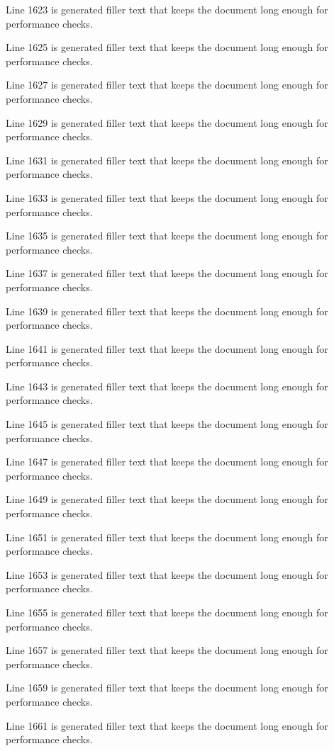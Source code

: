 Line 1623 is generated filler text that keeps the document long enough for performance checks.

Line 1625 is generated filler text that keeps the document long enough for performance checks.

Line 1627 is generated filler text that keeps the document long enough for performance checks.

Line 1629 is generated filler text that keeps the document long enough for performance checks.

Line 1631 is generated filler text that keeps the document long enough for performance checks.

Line 1633 is generated filler text that keeps the document long enough for performance checks.

Line 1635 is generated filler text that keeps the document long enough for performance checks.

Line 1637 is generated filler text that keeps the document long enough for performance checks.

Line 1639 is generated filler text that keeps the document long enough for performance checks.

Line 1641 is generated filler text that keeps the document long enough for performance checks.

Line 1643 is generated filler text that keeps the document long enough for performance checks.

Line 1645 is generated filler text that keeps the document long enough for performance checks.

Line 1647 is generated filler text that keeps the document long enough for performance checks.

Line 1649 is generated filler text that keeps the document long enough for performance checks.

Line 1651 is generated filler text that keeps the document long enough for performance checks.

Line 1653 is generated filler text that keeps the document long enough for performance checks.

Line 1655 is generated filler text that keeps the document long enough for performance checks.

Line 1657 is generated filler text that keeps the document long enough for performance checks.

Line 1659 is generated filler text that keeps the document long enough for performance checks.

Line 1661 is generated filler text that keeps the document long enough for performance checks.


